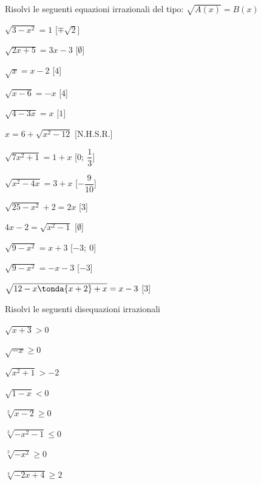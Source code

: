 \begin{esercizio}\label{ese:03.1}
Risolvi le seguenti equazioni irrazionali del tipo:
\(\sqrt{A(x)} = B(x)\)
\begin{multicols}{2}
\begin{enumeratea}
\item \(\sqrt{3 -x^2} = 1\) \hfill [\(\mp \sqrt{2}\)]
\item \(\sqrt{2x +5} = 3x -3\) \hfill [\(\emptyset\)]
\item \(\sqrt{x} = x-2\) \hfill [\(4\)]
\item \(\sqrt{x -6} = -x\) \hfill [\(4\)]
\item \(\sqrt{4 -3x} = x\) \hfill [\(1\)]
\item \(x = 6 +\sqrt{x^2 -12}\) \hfill [N.H.S.R.]
\item \(\sqrt{7x^2 +1} = 1 +x\) \hfill [\(0;~\dfrac{1}{3}\)]
\item \(\sqrt{x^2 -4x} = 3 +x\) \hfill [\(-\dfrac{9}{10}\)]
\item \(\sqrt{25 -x^2} +2 = 2x\) \hfill [\(3\)]
\item \(4x -2 = \sqrt{x^2 -1}\) \hfill [\(\emptyset\)]
\item \(\sqrt{9 -x^2} = x +3\) \hfill [\(-3;~0\)]
\item \(\sqrt{9 -x^2} = -x -3\) \hfill [\(-3\)]
\item \(\sqrt{12 -x\tonda{x +2} +x} = x -3\) \hfill [\(3\)]
\end{enumeratea}
\end{multicols}
\end{esercizio}

\begin{esercizio}\label{ese:03.1}
Risolvi le seguenti disequazioni irrazionali
\begin{multicols}{2}
\begin{enumeratea}
\item \(\sqrt{x+3} > 0\)
\item \(\sqrt{-x} \geq 0 \)
\item \(\sqrt{x^2 +1} > -2 \)
\item \(\sqrt{1 -x} < 0\)
\item \(\sqrt[3]{x-2} \geq 0\)
\item \(\sqrt[3]{-x^2-1} \leq 0\)
\item \(\sqrt[3]{-x^2} \geq 0\)
\item \(\sqrt[4]{-2x +4} \geq 2\)
\end{enumeratea}
\end{multicols}
\end{esercizio}

